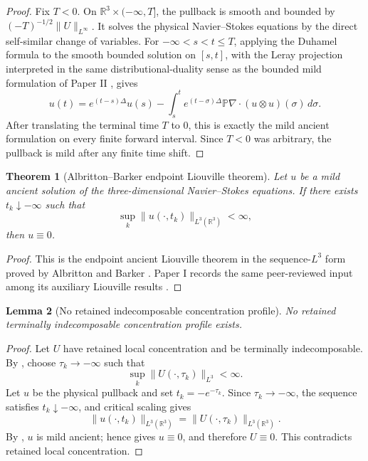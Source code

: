 \documentclass[11pt]{amsart}
\numberwithin{equation}{section}
\theoremstyle{plain}
\newtheorem{theorem}{Theorem}[section]
\newtheorem{lemma}[theorem]{Lemma}
\theoremstyle{definition}
\theoremstyle{remark}
\newcommand{\R}{\mathbb R}
\begin{document}
\begin{proof}
Fix \(T<0\).  On \(\R^3\times(-\infty,T]\), the pullback is smooth and bounded
by \((-T)^{-1/2}\|U\|_{L^\infty}\).  It solves the physical Navier--Stokes
equations by the direct self-similar change of variables.  For
\(-\infty<s<t\le T\), applying the Duhamel formula to the smooth bounded
solution on \([s,t]\), with the Leray projection interpreted in the same
distributional-duality sense as the bounded mild formulation of Paper II
\cite{DuranPaperII}, gives
\[
   u(t)=e^{(t-s)\Delta}u(s)
   -\int_s^t e^{(t-\sigma)\Delta}
      \mathbb P\nabla\cdot(u\otimes u)(\sigma)\,d\sigma .
\]
After translating the terminal time \(T\) to \(0\), this is exactly the mild
ancient formulation on every finite forward interval.  Since \(T<0\) was
arbitrary, the pullback is mild after any finite time shift.
\end{proof}

\begin{theorem}[Albritton--Barker endpoint Liouville theorem]
\label{thm:AB-main}
Let \(u\) be a mild ancient solution of the three-dimensional Navier--Stokes
equations.  If there exists \(t_k\downarrow-\infty\) such that
\[
   \sup_k\|u(\cdot,t_k)\|_{L^3(\R^3)}<\infty,
\]
then \(u\equiv0\).
\end{theorem}

\begin{proof}
This is the endpoint ancient Liouville theorem in the sequence-\(L^3\) form
proved by Albritton and Barker \cite{AlbrittonBarker2019}.  Paper I records the
same peer-reviewed input among its auxiliary Liouville results
\cite{DuranPaperI}.
\end{proof}

\begin{lemma}[No retained indecomposable concentration profile]
\label{lem:no-atomic-active}
No retained terminally indecomposable concentration profile exists.
\end{lemma}

\begin{proof}
Let \(U\) have retained local concentration and be terminally indecomposable.  By
, choose \(\tau_k\to-\infty\) such that
\[
   \sup_k\|U(\cdot,\tau_k)\|_{L^3}<\infty .
\]
Let \(u\) be the physical pullback and set \(t_k=-e^{-\tau_k}\).  Since
\(\tau_k\to-\infty\), the sequence satisfies \(t_k\downarrow-\infty\), and
critical scaling gives
\[
   \|u(\cdot,t_k)\|_{L^3(\R^3)}
   =
   \|U(\cdot,\tau_k)\|_{L^3(\R^3)}.
\]
By , \(u\) is mild ancient; hence
 gives \(u\equiv0\), and therefore \(U\equiv0\).  This
contradicts retained local concentration.
\end{proof}
\end{document}
